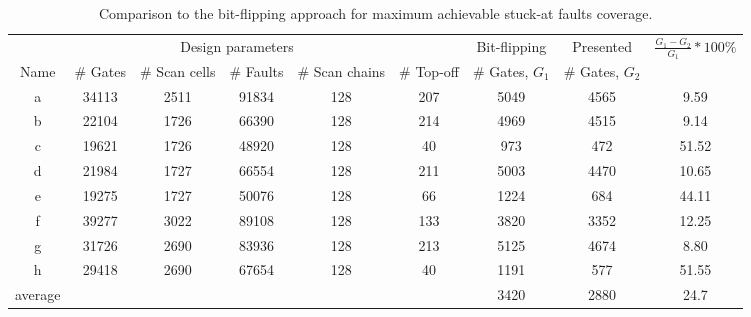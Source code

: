 \documentclass[10pt,conference]{IEEEtran}
\begin{document}
\begin{table*}[t!]\centering\footnotesize
\begin{tabular}{|c|c|c|c|c|c||c|c|c|} \hline               
\multicolumn{6}{|c|}{Design parameters} & Bit-flipping & Presented & \multirow{2}{*}{$\frac{G_1-G_2}{G_1}*100\%$}  \\ \cline{1-6}
Name	& \# Gates & \# Scan cells & \# Faults & \# Scan chains & \# Top-off & \# Gates, $G_1$ & \# Gates, $G_2$ & \\ \hline
a	& 34113	&	2511	&	91834	&	128	&	207	&	5049	&	4565	&	9.59	\\
b	& 22104	&	1726	&	66390	&	128	&	214	&	4969	&	4515	&	9.14	\\
c	& 19621	&	1726	&	48920	&	128	&	40	&	973	&	472	&	51.52	\\
d	& 21984	&	1727	&	66554	&	128	&	211	&	5003	&	4470	&	10.65	\\
e	& 19275	&	1727	&	50076	&	128	&	66	&	1224	&	684	&	44.11	\\
f	& 39277	&	3022	&	89108	&	128	&	133	&	3820	&	3352	&	12.25	\\
g	& 31726	&	2690	&	83936	&	128	&	213	&	5125	&	4674	&	8.80	\\
h	& 29418	&	2690	&	67654	&	128	&	40	&	1191	&	577	&	51.55	\\ \hline
average & \multicolumn{5}{|c||}{}	& 3420	&	2880	&	24.7	\\ \hline
\end{tabular}
\caption{Comparison to the bit-flipping approach for maximum achievable stuck-at faults coverage.}
\label{ta2}
\end{table*}
\end{document}
